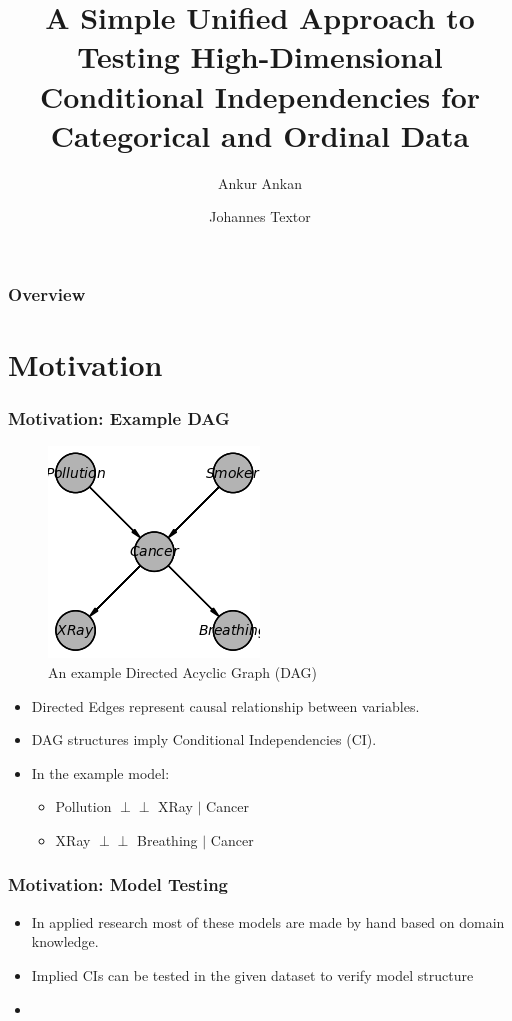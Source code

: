 \documentclass{beamer}
\def\ci{\perp\!\!\!\!\!\perp}
\begin{document}
\title{A Simple Unified Approach to Testing High-Dimensional Conditional
Independencies for Categorical and Ordinal Data}
\author {Ankur Ankan \and Johannes Textor}
\date{}
\maketitle

\begin{frame}
	\frametitle{Overview}
	\tableofcontents
\end{frame}

\section{Motivation}
\begin{frame}
	\frametitle{Motivation: Example DAG}
	\begin{figure}
		\centering
		\includegraphics[scale=0.6]{imgs/example_dag.png}
		\caption*{An example Directed Acyclic Graph (DAG)}
	\end{figure}
	\begin{itemize}
		\item Directed Edges represent causal relationship between variables.
		\item DAG structures imply Conditional Independencies (CI).
		\item In the example model:
			\begin{itemize}
				\item Pollution $ \ci $ XRay $ | $ Cancer
				\item XRay $ \ci $ Breathing $ | $ Cancer
			\end{itemize}
	\end{itemize}
\end{frame}

\begin{frame}
	\frametitle{Motivation: Model Testing}
	\begin{itemize}
		\item In applied research most of these models are made by hand
			based on domain knowledge.
		\item Implied CIs can be tested in the given dataset to verify
			model structure
		\item {}
	\end{itemize}
\end{frame}
\end{document}
